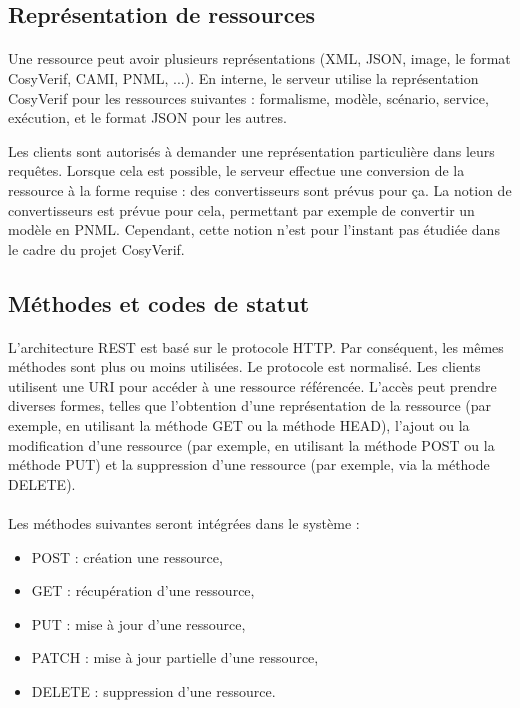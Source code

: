 \documentclass{report}
\begin{document}
\subsection{Représentation de ressources}

\paragraph{}
Une ressource peut avoir plusieurs représentations (XML, JSON, image, le format CosyVerif, CAMI, PNML, ...). En interne, 
le serveur utilise la représentation CosyVerif pour les ressources suivantes : formalisme, modèle, scénario, service, 
exécution, et le format JSON pour les autres.

Les clients sont autorisés à demander une représentation particulière dans leurs requêtes. Lorsque cela est possible, le 
serveur effectue une conversion de la ressource à la forme requise : des convertisseurs sont prévus pour ça.
La notion de convertisseurs est prévue pour cela, permettant par exemple de
convertir un modèle en PNML. Cependant, cette notion n'est pour l'instant
pas étudiée dans le cadre du projet CosyVerif.

      
\subsection{Méthodes et codes de statut}

\paragraph{}
L'architecture REST est basé sur le protocole HTTP. Par conséquent, les mêmes méthodes sont plus ou moins utilisées. 
Le protocole est normalisé. Les clients utilisent une URI pour accéder à une 
ressource référencée. L'accès peut prendre diverses formes, telles que l'obtention d'une représentation de la ressource 
(par exemple, en utilisant la méthode GET ou la méthode HEAD), l'ajout ou la modification d'une ressource (par exemple, 
en utilisant la méthode POST ou la méthode PUT) et la suppression d'une ressource (par exemple, via la méthode DELETE).

\paragraph{}
Les méthodes suivantes seront intégrées dans le système :

\begin{itemize}
   \item POST : création une ressource,
   \item GET : récupération d'une ressource,
   \item PUT : mise à jour d'une ressource,
   \item PATCH : mise à jour partielle d'une ressource,
   \item DELETE : suppression d'une ressource.
\end{itemize}
\end{document}
